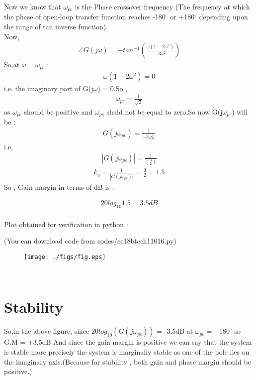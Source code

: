 \begin{enumerate}[label=\thesection.\arabic*.,ref=\thesection.\theenumi]
Now we know that $\omega_{pc}$ is the Phase crossover frequency (The frequency at which the phase of open-loop transfer function reaches -180$^{\circ}$ or +180$^{\circ}$ depending upon the range of tan inverse function).\\
Now,
\begin{align}
\angle G(j\omega)=- tan^{-1}(\frac{\omega(1-2\omega^2)}{-3\omega^2})
\end{align}
So,at $\omega=\omega_{pc}$ :
\begin{align}
\omega(1-2\omega^2) = 0 
\end{align}
i.e. the imaginary part of G(j$\omega$) = 0.So ,
\begin{align}
\omega_{pc} = \frac{1}{\sqrt{2}} 
\end{align}
as $\omega_{pc}$ should be positive and $\omega_{pc}$ shuld not be equal to zero.So now G(j$\omega_{pc}$) will be :
\begin{align}
G(j\omega_{pc}) = \frac{1}{-3\omega_{pc}^2}
\end{align}
i.e,
\begin{align}
|G(j\omega_{pc})| = \frac{1}{(\frac{3}{2})}
\end{align}
\begin{align}
k_{g}=\frac{1}{|G(j\omega_{pc})|} = \frac{3}{2}=1.5
\end{align}
So , Gain margin in terms of dB is :

\begin{align}
20log_{10}1.5 = 3.5dB
\end{align}
\\

Plot obtained for verification in python :

(You can download code from codes/ee18btech11016.py)
\begin{figure}[htp]
	\centering
	\texttt{[image: ./figs/fig.eps]}
	\caption{}
	\label{fig:Phase}
\end{figure}
\\

\section{Stability}

So,in the above figure, since $20log_{10}(G(j\omega_{pc}))$ = -3.5dB at $\omega_{pc} = -180^{\circ}$ so G.M = +3.5dB And since the gain margin is positive we can say that the system is stable more precisely the system is marginally stable as one of the pole lies on the imaginary axis.(Because for stability , both gain and phase margin should be positive.)
\\


\end{enumerate}
